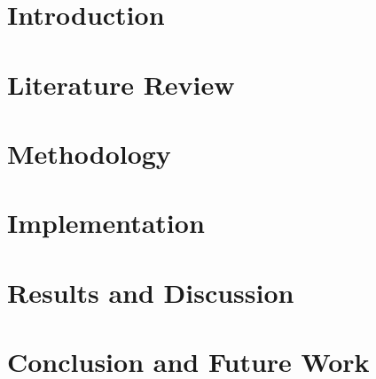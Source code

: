 \documentclass[12pt,a4paper]{book}
\begin{document}
\frontmatter  %

\thispagestyle{empty}




\tableofcontents
\listoffigures
\printglossary[type=\acronymtype, title=List of Abbreviations]

\mainmatter  %

\preto{\chapter}{\thispagestyle{empty}}


\chapter{Introduction}


\chapter{Literature Review}


\chapter{Methodology}


\chapter{Implementation}


\chapter{Results and Discussion}


\chapter{Conclusion and Future Work}


\printbibliography

\appendix



\end{document}
